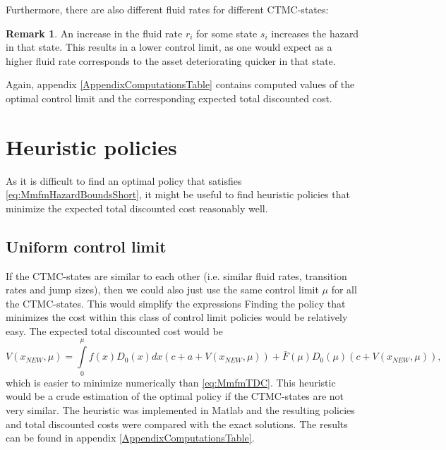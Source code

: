 \documentclass[a4paper]{thesis}
\theoremstyle{definition}
\newtheorem{remark}{Remark}[chapter]
\begin{document}
Furthermore, there are also different fluid rates for different CTMC-states:
\begin{remark}
	An increase in the fluid rate $r_i$ for some state $s_i$ increases the hazard in that state.
	This results in a lower control limit, as one would expect as a higher fluid rate corresponds to the asset deteriorating quicker in that state.
\end{remark}

Again, appendix \ref{AppendixComputationsTable} contains computed values of the optimal control limit and the corresponding expected total discounted cost. \section{Heuristic policies}\label{section:MmfmHeuristics}
As it is difficult to find an optimal policy that satisfies \eqref{eq:MmfmHazardBoundsShort}, it might be useful to find heuristic policies that minimize the expected total discounted cost reasonably well.

\subsection{Uniform control limit}
If the CTMC-states are similar to each other (i.e. similar fluid rates, transition rates and jump sizes), then we could also just use the same control limit $\mu$ for all the CTMC-states.
This would simplify the expressions 
Finding the policy that minimizes the cost within this class of control limit policies would be relatively easy.
The expected total discounted cost would be
\[
V(x_{NEW},\mu)=\int\limits_0^\mu f(x)D_0(x)dx (c+a+V(x_{NEW},\mu))+\bar{F}(\mu)D_0(\mu)(c+V(x_{NEW},\mu)),
\]
which is easier to minimize numerically than \eqref{eq:MmfmTDC}.
This heuristic would be a crude estimation of the optimal policy if the  CTMC-states are not very similar. 
The heuristic was implemented in Matlab and the resulting policies and total discounted costs were compared with the exact solutions.
The results can be found in appendix \ref{AppendixComputationsTable}.
\end{document}
